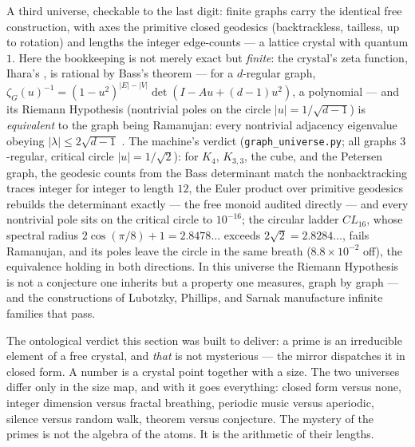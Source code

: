 \documentclass[11pt]{article}
\theoremstyle{remark}
\begin{document}
A third universe, checkable to the last digit: finite graphs carry the identical free
construction, with axes the primitive closed geodesics (backtrackless, tailless, up to rotation)
and lengths the integer edge-counts --- a lattice crystal with quantum $1$. Here the bookkeeping
is not merely exact but \emph{finite}: the crystal's zeta function, Ihara's \cite{Ihara}, is
rational by Bass's theorem \cite{Bass} --- for a $d$-regular graph,
$\zeta_G(u)^{-1} = (1-u^2)^{|E|-|V|}\det(I - Au + (d-1)u^2)$, a polynomial --- and its Riemann
Hypothesis (nontrivial poles on the circle $|u| = 1/\sqrt{d-1}$) is \emph{equivalent} to the
graph being Ramanujan: every nontrivial adjacency eigenvalue obeying $|\lambda| \le 2\sqrt{d-1}$
\cite{Terras, LPS}. The machine's verdict (\texttt{graph\_universe.py}; all graphs $3$-regular,
critical circle $|u| = 1/\sqrt2$): for $K_4$, $K_{3,3}$, the cube, and the Petersen graph, the
geodesic counts from the Bass determinant match the nonbacktracking traces integer for integer to
length $12$, the Euler product over primitive geodesics rebuilds the determinant exactly --- the
free monoid audited directly --- and every nontrivial pole sits on the critical circle to
$10^{-16}$; the circular ladder $CL_{16}$, whose spectral radius $2\cos(\pi/8) + 1 = 2.8478\ldots$
exceeds $2\sqrt2 = 2.8284\ldots$, fails Ramanujan, and its poles leave the circle in the same
breath ($8.8 \times 10^{-2}$ off), the equivalence holding in both directions. In this universe
the Riemann Hypothesis is not a conjecture one inherits but a property one measures, graph by
graph --- and the constructions of Lubotzky, Phillips, and Sarnak \cite{LPS} manufacture infinite
families that pass.

The ontological verdict this section was built to deliver: a prime is an irreducible element of a
free crystal, and \emph{that} is not mysterious --- the mirror dispatches it in closed form. A number
is a crystal point together with a size. The two universes differ only in the size map, and with it
goes everything: closed form versus none, integer dimension versus fractal breathing, periodic music
versus aperiodic, silence versus random walk, theorem versus conjecture. The mystery of the primes is
not the algebra of the atoms. It is the arithmetic of their lengths.
\end{document}
